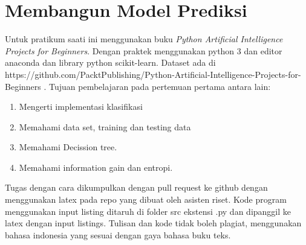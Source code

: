 \chapter{Membangun Model Prediksi}

Untuk pratikum saati ini menggunakan buku \textit{Python Artificial Intelligence Projects for Beginners}\cite{eckroth2018python}. Dengan praktek menggunakan python 3 dan editor anaconda dan library python scikit-learn.
Dataset ada di https://github.com/PacktPublishing/Python-Artificial-Intelligence-Projects-for-Beginners .
Tujuan pembelajaran pada pertemuan pertama antara lain:
\begin{enumerate}
\item
Mengerti implementasi klasifikasi
\item
Memahami data set, training dan testing data
\item
Memahami Decission tree.
\item
Memahami information gain dan entropi.
\end{enumerate}
Tugas dengan cara dikumpulkan dengan pull request ke github dengan menggunakan latex pada repo yang dibuat oleh asisten riset. Kode program menggunakan input listing ditaruh di folder src ekstensi .py dan dipanggil ke latex dengan input listings. Tulisan dan kode tidak boleh plagiat, menggunakan bahasa indonesia yang sesuai dengan gaya bahasa buku teks.

